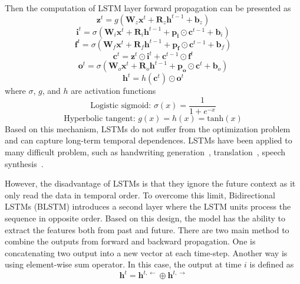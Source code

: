 Then the computation of LSTM layer forward propagation can be presented as
\begin{equation}
\mathbf{z}^t = g( \mathbf{W}_z \mathbf{x}^t + \mathbf{R}_z \mathbf{h}^{t-1} + \mathbf{b}_z)
\end{equation}
\begin{equation}
\mathbf{i}^t = \sigma( \mathbf{W}_i \mathbf{x}^t + \mathbf{R}_i \mathbf{h}^{t-1} + \mathbf{p_i} \odot \mathbf{c}^{t-1} + \mathbf{b}_i)
\end{equation}
\begin{equation}
\mathbf{f}^t = \sigma( \mathbf{W}_f \mathbf{x}^t + \mathbf{R}_f \mathbf{h}^{t-1} + \mathbf{p_f} \odot \mathbf{c}^{t-1} + \mathbf{b}_f)
\end{equation}
\begin{equation}
\mathbf{c}^t = \mathbf{z}^t \odot \mathbf{i}^t + \mathbf{c}^{t-1} \odot \mathbf{f}^t
\end{equation}
\begin{equation}
\mathbf{o}^t = \sigma( \mathbf{W}_o \mathbf{x}^t + \mathbf{R}_o \mathbf{h}^{t-1} + \mathbf{p_o} \odot \mathbf{c}^{t} + \mathbf{b}_o)
\end{equation}
\begin{equation}
\mathbf{h}^t = h(\mathbf{c}^t) \odot \mathbf{o}^t
\end{equation}
where $\sigma$, $g$, and $h$ are activation functions
\begin{equation}
\mbox{Logistic sigmoid: } \sigma (x) = \frac{1}{1+e^{-x}}
\end{equation}
\begin{equation}
\mbox{Hyperbolic tangent: } g (x) = h(x) = \mbox{tanh}(x)
\end{equation}
Based on this mechanism, LSTMs do not suffer from the optimization problem and can capture long-term temporal dependences. LSTMs have been applied to many difficult problem, such as handwriting generation~\cite{Graves2013}, translation~\cite{Luong2014}, speech synthesis~\cite{fan2014tts}. 

However, the disadvantage of LSTMs is that they ignore the future context as it only read the data in temporal order. To overcome this limit, Bidirectional LSTMs (BLSTM) introduces a second layer where the LSTM units process the sequence in opposite order. Based on this design, the model has the ability to extract the features both from past and future. There are two main method to combine the outputs from forward and backward propagation. One is concatenating two output into a  new vector at each time-step. Another way is using element-wise sum operator. In this case, the output at time $i$ is defined as 
\begin{equation}
\label{element_wise_sum}
\mathbf{h}^{t} = \mathbf{h}^{t,\leftarrow} \oplus \mathbf{h}^{t, \rightarrow}
\end{equation}

